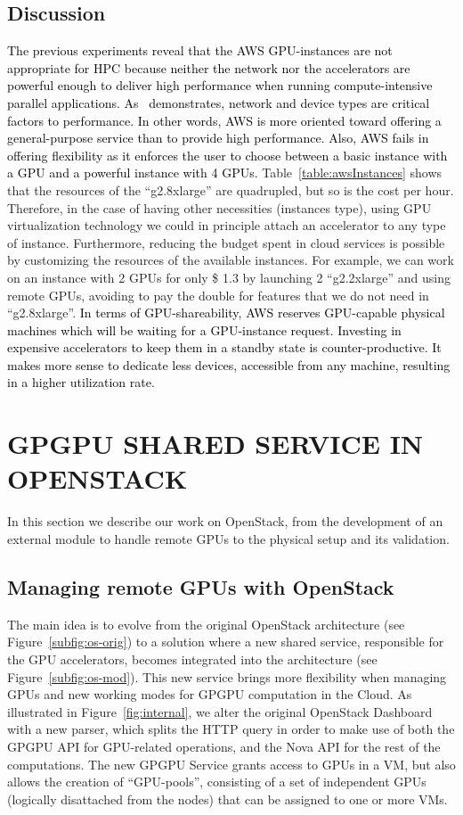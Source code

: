 \documentclass[a4paper,twoside]{article}
\begin{document}
\subsection{Discussion}
\textcolor{black}{The previous experiments reveal that the AWS GPU-instances are not appropriate for HPC
because neither the network nor the accelerators are powerful enough to deliver high performance
when running compute-intensive parallel applications. As~\cite{tonithesis} demonstrates, network and device types are critical factors to performance.
In other words, AWS is more oriented toward offering a general-purpose service than to provide high performance.
Also, AWS fails in offering flexibility as it enforces the user to choose between a basic instance with a GPU and a powerful instance with 4 GPUs.}
Table~\ref{table:awsInstances} shows that the resources of the ``g2.8xlarge'' are quadrupled, but so is the cost per hour.
Therefore, in the case of having other necessities (instances type), using GPU virtualization technology we could in principle attach an accelerator to any type of instance.
Furthermore, reducing the budget spent in cloud services is possible by customizing the resources of the available instances.
For example, we can work on an instance with 2 GPUs for only \$ 1.3 by launching 2 ``g2.2xlarge'' and using remote GPUs, avoiding to pay the double for features that we do not need in ``g2.8xlarge''.
\textcolor{black}{
In terms of GPU-shareability, AWS reserves GPU-capable physical machines which will be waiting for a GPU-instance request.
Investing in expensive accelerators to keep them in a standby state is counter-productive. 
It makes more sense to dedicate less devices, accessible from any machine, resulting in a higher utilization rate.
}
\section{\uppercase{GPGPU Shared Service in OpenStack}}
\label{sec:gpgpuOS}
In this section we describe our work on OpenStack, from the development of an external module to handle remote GPUs to the physical setup and its validation.

\subsection{Managing remote GPUs with OpenStack}
The main idea is to evolve from the original OpenStack architecture (see Figure~\ref{subfig:os-orig})
 to a solution where a new shared service, responsible for the GPU accelerators, becomes integrated into the architecture (see Figure~\ref{subfig:os-mod}).
This new service brings more flexibility when managing GPUs and new working modes for GPGPU computation in the Cloud.
As illustrated in Figure~\ref{fig:internal}, we alter the original OpenStack Dashboard with a new parser, 
which splits the HTTP query in order to make use of both the GPGPU API for GPU-related operations, and the Nova API for the rest of the computations. 
The new GPGPU Service grants access to GPUs in a VM, but also allows the creation of ``GPU-pools'', consisting of a set of independent GPUs (logically disattached from the nodes) that can be assigned to one or more VMs.
\end{document}
